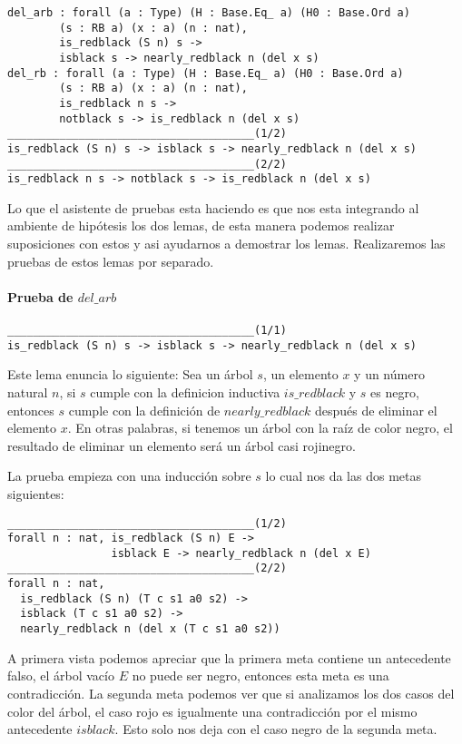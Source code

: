 \begin{verbatim}
del_arb : forall (a : Type) (H : Base.Eq_ a) (H0 : Base.Ord a)
        (s : RB a) (x : a) (n : nat),
        is_redblack (S n) s ->
        isblack s -> nearly_redblack n (del x s)
del_rb : forall (a : Type) (H : Base.Eq_ a) (H0 : Base.Ord a)
        (s : RB a) (x : a) (n : nat),
        is_redblack n s ->
        notblack s -> is_redblack n (del x s)
______________________________________(1/2)
is_redblack (S n) s -> isblack s -> nearly_redblack n (del x s)
______________________________________(2/2)
is_redblack n s -> notblack s -> is_redblack n (del x s)
\end{verbatim}

Lo que el asistente de pruebas esta haciendo es que nos esta integrando al ambiente de hip\'otesis
los dos lemas, de esta manera podemos realizar suposiciones con estos y asi ayudarnos a demostrar
los lemas. Realizaremos las pruebas de estos lemas por separado.

\paragraph{Prueba de $del\_arb$}

\begin{verbatim}
______________________________________(1/1)
is_redblack (S n) s -> isblack s -> nearly_redblack n (del x s)
\end{verbatim}

Este lema enuncia lo siguiente: Sea un \'arbol $s$, un elemento $x$ y un n\'umero natural $n$, si
$s$ cumple con la definicion inductiva $is\_redblack$ y $s$ es negro, entonces $s$ cumple con la
definición de $nearly\_redblack$ después de eliminar el elemento $x$. En otras palabras, si tenemos
un \'arbol con la raíz de color negro, el resultado de eliminar un elemento ser\'a un \'arbol casi
 rojinegro.

La prueba empieza con una inducci\'on sobre $s$ lo cual nos da las dos metas siguientes:
\begin{verbatim}
______________________________________(1/2)
forall n : nat, is_redblack (S n) E ->
                isblack E -> nearly_redblack n (del x E)
______________________________________(2/2)
forall n : nat,
  is_redblack (S n) (T c s1 a0 s2) ->
  isblack (T c s1 a0 s2) ->
  nearly_redblack n (del x (T c s1 a0 s2))
\end{verbatim}

A primera vista podemos apreciar que la primera meta contiene un antecedente falso, el \'arbol
vacío $E$ no puede ser negro, entonces esta meta es una contradicci\'on. La segunda meta podemos
ver que si analizamos los dos casos del color del \'arbol, el caso rojo es igualmente una
contradicci\'on por el mismo antecedente $isblack$. Esto solo nos deja con el caso negro de la
segunda meta.

